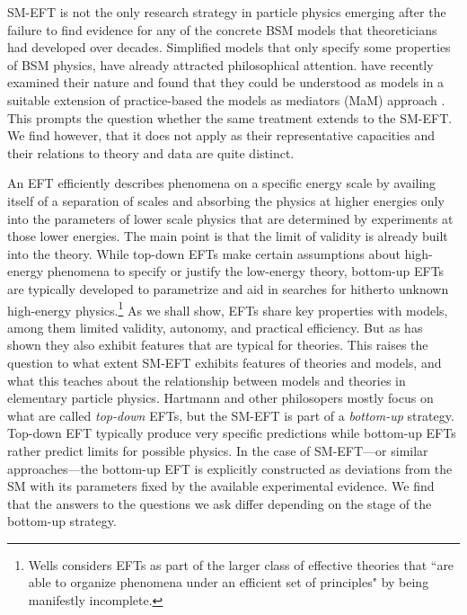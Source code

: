 SM-EFT is not the only research strategy in particle physics emerging after the failure to find evidence for any of the concrete BSM models that theoreticians had developed over decades. 
Simplified models that only specify some properties of BSM physics, have already attracted philosophical attention. 
\citet{mccoymassimi} have recently examined their nature and found that they could be understood as models in a suitable extension of practice-based the models as mediators (MaM) approach \citep{morganmorrison}.
This prompts the question whether the same treatment extends to the SM-EFT. 
We find however, that it does not apply as their representative capacities and their relations to theory and data are quite distinct. 

An EFT efficiently describes phenomena on a specific energy scale by availing itself of a separation of scales and absorbing the physics at higher energies only into the parameters of lower scale physics that are determined by experiments at those lower energies. The main point is that the limit of validity is already built into the theory. While top-down EFTs make certain assumptions about high-energy phenomena to specify or justify the low-energy theory, bottom-up EFTs are typically developed to parametrize and aid in searches for hitherto unknown high-energy physics.\footnote{Wells considers EFTs as part of the larger class of effective theories that ``are able to organize phenomena under an efficient set of principles" \citep[p.~1]{wells2012} by being manifestly incomplete.}
As we shall show, EFTs share key properties with models, among them limited validity, autonomy, and practical efficiency. 
But as \citet{hartmann2001} has shown they also exhibit features that are typical for theories. 
This raises the question to what extent SM-EFT exhibits features of theories and models, and what this teaches about the relationship between models and theories in elementary particle physics.
Hartmann and other philosopers mostly focus on what are called \textit{top-down} EFTs, but the SM-EFT is part of a \textit{bottom-up} strategy.
Top-down EFT typically produce very specific predictions while bottom-up EFTs rather predict limits for possible physics. 
In the case of SM-EFT---or similar approaches---the bottom-up EFT is explicitly constructed as deviations from the SM with its parameters fixed by the available experimental evidence. 
We find that the answers to the questions we ask differ depending on the stage of the bottom-up strategy.

